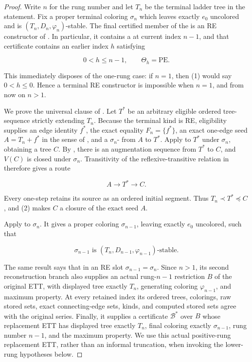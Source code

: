 \begin{proof}
Write \(n\) for the rung number and let \(T_n\) be the terminal ladder
tree in the statement.  Fix a proper terminal coloring \(\sigma_n\) which
leaves exactly \(e_0\) uncolored and is
\((T_n,D_n,\varphi_n)\)-stable.  The final certified member of the
 is an RE constructor of
.  In particular, it contains a
 at current index \(n-1\), and
that certificate contains an earlier index \(h\) satisfying

\[
 0<h\leq n-1,\qquad \Theta_h=\mathrm{PE}.                    \tag{1}
\]

This immediately disposes of the one-rung case: if \(n=1\), then (1)
would say \(0<h\leq0\).  Hence a terminal RE constructor is impossible
when \(n=1\), and from now on \(n>1\).

We prove the universal clause of .  Let \(T^*\) be
an arbitrary eligible ordered tree-sequence strictly extending \(T_n\).
Because the terminal kind is RE, eligibility supplies an edge identity
\(f^*\), the exact equality \(F_n=\{f^*\}\), an exact one-edge seed
\(A=T_n+f^*\) in the sense of , and a
\(\sigma_n\)- from \(A\) to
\(T^*\).  Apply  to \(T^*\) under
\(\sigma_n\), obtaining a tree \(C\).  By ,
there is an augmentation sequence from \(T^*\) to \(C\), and \(V(C)\)
is closed under \(\sigma_n\).  Transitivity of the reflexive-transitive
relation in  therefore gives a
route

\[
                 A\longrightarrow T^*\longrightarrow C.     \tag{2}
\]

Every one-step  retains its source as an
ordered initial segment.  Thus
\(T_n\prec T^*\preccurlyeq C\), and (2) makes \(C\) a closure of the
exact seed \(A\).

Apply  to \(\sigma_n\).  It gives a
proper coloring \(\sigma_{n-1}\), leaving exactly \(e_0\) uncolored, such
that

\[
 \sigma_{n-1}\text{ is }(T_n,D_{n-1},\varphi_{n-1})
 \text{-stable}.                                             \tag{3}
\]

The same result says that in an RE slot
\(\sigma_{n-1}=\sigma_n\).  Since \(n>1\), its second reconstruction
branch also supplies an actual rung-\(n-1\) restriction \(B\) of the
original ETT, with displayed tree exactly \(T_n\), generating coloring
\(\varphi_{n-1}\), and maximum property.  At every retained index its
ordered trees, colorings, raw stored sets, exact connecting-edge sets,
kinds, and computed stored sets agree with the original series.  Finally,
it supplies a  certificate
\(\mathcal B^*\) over \(B\) whose replacement ETT has displayed tree
exactly \(T_n\), final coloring exactly \(\sigma_{n-1}\), rung number
\(n-1\), and the maximum property.  We use this actual positive-rung
replacement ETT, rather than an informal truncation, when invoking the
lower-rung hypotheses below.


\end{proof}

